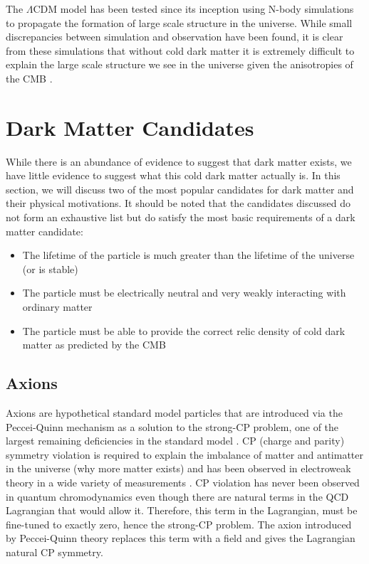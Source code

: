 The $\Lambda$CDM model has been tested since its inception using N-body simulations to propagate the formation of large scale structure in the universe.  While small discrepancies between simulation and observation have been found, it is clear from these simulations that without cold dark matter it is extremely difficult to explain the large scale structure we see in the universe given the anisotropies of the CMB \cite{navarro1996structure, springel2006large, vogelsberger2014introducing}.



\section{Dark Matter Candidates}
\label{sec:dm_candidates}

While there is an abundance of evidence to suggest that dark matter exists, we have little evidence to suggest what this cold dark matter actually is.  In this section, we will discuss two of the most popular candidates for dark matter and their physical motivations.  It should be noted that the candidates discussed do not form an exhaustive list but do satisfy the most basic requirements of a dark matter candidate:

\begin{itemize}
        \item The lifetime of the particle is much greater than the lifetime of the universe (or is stable)
        \item  The particle must be electrically neutral and very weakly interacting with ordinary matter
        \item The particle must be able to provide the correct relic density of cold dark matter as predicted by the CMB
\end{itemize}


\subsection{Axions}



Axions are hypothetical standard model particles that are introduced via the Peccei-Quinn mechanism as a solution to the strong-CP problem, one of the largest remaining deficiencies in the standard model \cite{axion_1977}.  CP (charge and parity) symmetry violation is required to explain the imbalance of matter and antimatter in the universe (why more matter exists) and has been observed in electroweak theory in a wide variety of measurements \cite{alavi1999observation, fanti1999new, aubert2001measurement, abe2001observation, aaij2013first}.  CP violation has never been observed in quantum chromodynamics even though there are natural terms in the QCD Lagrangian that would allow it.  Therefore, this term in the Lagrangian, must be fine-tuned to exactly zero, hence the strong-CP problem.  The axion introduced by Peccei-Quinn theory replaces this term with a field and gives the Lagrangian natural CP symmetry.

